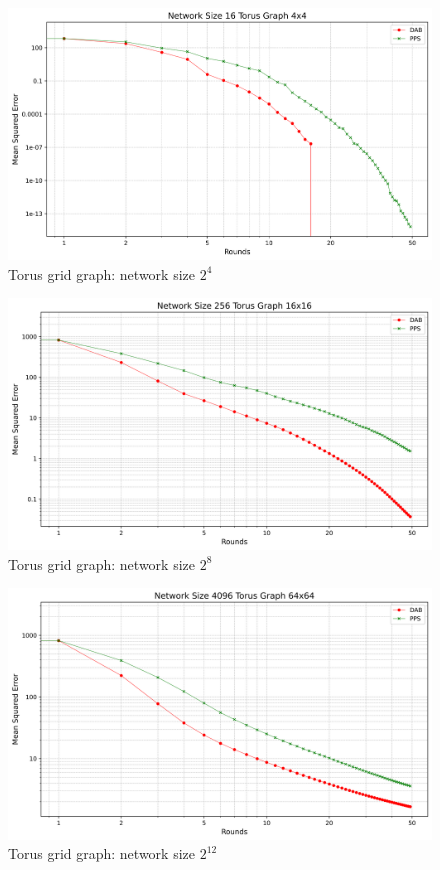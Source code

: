 \begin{figure}[H]
    \centering
    \includegraphics[scale=0.5]{figures/torusGridGraphSimulations/DAB_vs_PPS_TG_r50_n16.png}
    \caption{Torus grid graph: network size $2^{4}$}
    \label{fig:16torusGraph}
\end{figure}

\begin{figure}[H]
    \centering
    \includegraphics[scale=0.5]{figures/torusGridGraphSimulations/DAB_vs_PPS_TG_r50_n256.png}
    \caption{Torus grid graph: network size $2^{8}$}
    \label{fig:256torusGraph}
\end{figure}

\begin{figure}[H]
    \centering
    \includegraphics[scale=0.5]{figures/torusGridGraphSimulations/DAB_vs_PPS_TG_r50_n4096.png}
    \caption{Torus grid graph: network size $2^{12}$}
    \label{fig:4096torusGraph}
\end{figure}

